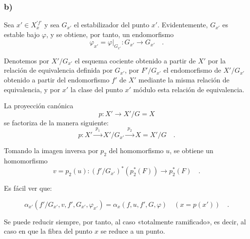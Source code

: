 \subsubsection*{b)} Sea $x'\in X_x^{\prime f'}$ y sea $G_{x'}$ el estabilizador del punto $x'$. Evidentemente, $G_{x'}$ es estable bajo $\varphi$, y se obtiene, por tanto, un endomorfismo
\[
\varphi_{x'} = \varphi|_{G_{x'}} : G_{x'} \longrightarrow G_{x'} \quad .
\]

Denotemos por $X'/G_{x'}$ el esquema cociente obtenido a partir de $X'$ por la relación de equivalencia definida por $G_{x'}$, por $F'/G_{x'}$ el endomorfismo de $X'/G_{x'}$ obtenido a partir del endomorfismo $f'$ de $X'$ mediante la misma relación de equivalencia, y por $x'$ la clase del punto $x'$ módulo esta relación de equivalencia.%

La proyección canónica
\[
p : X' \longrightarrow X'/G = X
\]
se factoriza de la manera siguiente:
\[
p : X' \xrightarrow{\;p_1\;} X'/G_{x'} \xrightarrow{\;p_2\;} X = X'/G \quad .
\]

Tomando la imagen inversa por $p_2$ del homomorfismo $u$, se obtiene un homomorfismo
\[
v = p_2(u) : (f'/G_{x'})^*(p_2^*(F)) \longrightarrow p_2^*(F) \quad .
\]

Es fácil ver que:

\begin{equation}\tag{6.4.3}
\alpha_{x'}(f'/G_{x'}, v, f', G_{x'}, \varphi_{x'}) = \alpha_x(f,u, f', G, \varphi) \quad (x = p(x')) \quad .
\end{equation}

Se puede reducir siempre, por tanto, al caso «totalmente ramificado», es decir, al caso en que la fibra del punto $x$ se reduce a un punto.
